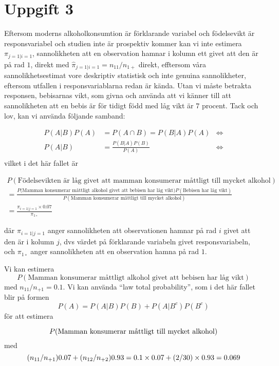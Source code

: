 \documentclass[]{article}
\begin{document}
\hypertarget{uppgift-3}{%
\section{Uppgift 3}\label{uppgift-3}}

Eftersom moderns alkoholkonsumtion är förklarande variabel och
födelsevikt är responsvariabel och studien inte är prospektiv kommer kan
vi inte estimera \(\pi_{j = 1| i =1}\), sannolikheten att en observation
hamnar i kolumn ett givet att den är på rad \(1\), direkt med
\(\widehat{\pi}_{j = 1| i =1} = n_{11}/n_{1+}\) direkt, efftersom våra
sannolikhetsestimat vore deskriptiv statistisk och inte genuina
sannolikheter, eftersom utfallen i responsvariablarna redan är kända.
Utan vi måste betrakta responsen, bebisarnas vikt, som givna och använda
att vi känner till att sannolikheten att en bebis är för tidigt född med
låg vikt är \(7\) procent. Tack och lov, kan vi använda följande
samband:

\[
\begin{aligned}
  P(A|B)P(A) &= P(A \cap B) = P(B | A)P(A) &\Leftrightarrow\\
      P(A|B) &= \frac{P(B|A)P(B)}{P(A)} &\Leftrightarrow \\
\end{aligned}
\] vilket i det här fallet är

\[
\begin{aligned}
P(\text{Födelsevikten är låg givet att mamman konsumerar måttligt till mycket alkohol})  
\\= \frac{P(\text{Mamman konsumerar måttligt alkohol givet att bebisen har låg vikt)}P(\text{Bebisen har låg vikt})}{P(\text{Mamman konsumerar måttligt till mycket alkohol})}\\ = \frac{\pi_{i = 1  | j = 1}\times0.07}{\pi_{1\circ}} 
\end{aligned}
\]

där \(\pi_{i = 1| j = 1}\) anger sannolikheten att observationen hamnar
på rad \(i\) givet att den är i kolumn \(j\), dvs värdet på förklarande
variabeln givet responsvariabeln, och \(\pi_{1\circ}\) anger
sannolikheten att en observation hamna på rad \(1\).

Vi kan estimera \[
P(\text{Mamman konsumerar måttligt alkohol givet att bebisen har låg vikt})
\] med \(n_{11}/n_{+1} = 0.1\). Vi kan använda ``law total
probability'', som i det här fallet blir på formen
\[P(A) = P(A|B)P(B) + P(A|B^{c})P(B^{c})\] för att estimera

\[
P(\text{Mamman konsumerar måttligt till mycket alkohol})\\
\] med
\[(n_{11}/n_{+1})0.07+ (n_{12}/n_{+2})0.93 \\= 0.1\times0.07+ (2/30)\times0.93 \\= 0.069\]
\end{document}
